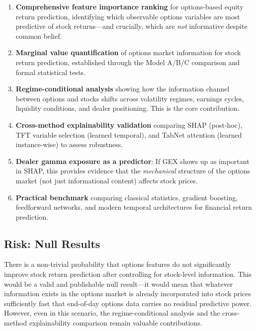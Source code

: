 \documentclass[11pt,a4paper]{article}
\begin{document}
\begin{enumerate}
    \item \textbf{Comprehensive feature importance ranking} for options-based equity return prediction, identifying which observable options variables are most predictive of stock returns---and crucially, which are \emph{not} informative despite common belief.
    
    \item \textbf{Marginal value quantification} of options market information for stock return prediction, established through the Model A/B/C comparison and formal statistical tests.
    
    \item \textbf{Regime-conditional analysis} showing how the information channel between options and stocks shifts across volatility regimes, earnings cycles, liquidity conditions, and dealer positioning. This is the core contribution.
    
    \item \textbf{Cross-method explainability validation} comparing SHAP (post-hoc), TFT variable selection (learned temporal), and TabNet attention (learned instance-wise) to assess robustness.
    
    \item \textbf{Dealer gamma exposure as a predictor}: If GEX shows up as important in SHAP, this provides evidence that the \emph{mechanical} structure of the options market (not just informational content) affects stock prices.
    
    \item \textbf{Practical benchmark} comparing classical statistics, gradient boosting, feedforward networks, and modern temporal architectures for financial return prediction.
\end{enumerate}

\subsection{Risk: Null Results}

\begin{warningbox}
There is a non-trivial probability that options features do not significantly improve stock return prediction after controlling for stock-level information. This would be a valid and publishable null result---it would mean that whatever information exists in the options market is already incorporated into stock prices sufficiently fast that end-of-day options data carries no residual predictive power. However, even in this scenario, the regime-conditional analysis and the cross-method explainability comparison remain valuable contributions.
\end{warningbox}
\end{document}
